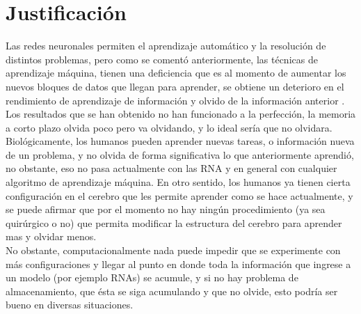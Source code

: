 \section{Justificación}
	
	
    Las redes neuronales permiten el aprendizaje automático y la resolución 
    de distintos problemas,  pero como se comentó anteriormente,  las técnicas 
    de aprendizaje máquina, tienen una deficiencia que es al momento de aumentar 
    los nuevos bloques de datos que llegan para aprender,  se obtiene un deterioro 
    en el rendimiento de aprendizaje de información y olvido de la información anterior \cite{bullinaria2009}.\\
    
    Los resultados que se han obtenido no han funcionado a la perfección, la 
    memoria a corto plazo olvida poco pero va olvidando, y lo ideal sería que no 
    olvidara. Biológicamente, los humanos pueden aprender nuevas tareas, o información 
    nueva de un problema, y no olvida de forma significativa lo que anteriormente 
    aprendió, no obstante, eso no pasa actualmente con las RNA y en general con 
    cualquier algoritmo de aprendizaje máquina. En otro sentido, los humanos 
    ya tienen cierta configuración en el cerebro que les permite aprender como 
    se hace actualmente,  y se puede afirmar que por el momento no hay ningún 
    procedimiento (ya sea quirúrgico o no) que permita modificar la estructura del cerebro 
    para aprender mas y olvidar menos.\\

    No obstante,  computacionalmente nada puede impedir que se experimente con más 
    configuraciones y llegar al punto en donde toda la información que ingrese a un 
    modelo (por ejemplo RNAs) se acumule, y si no hay problema de almacenamiento, que \'esta se siga 
    acumulando y que no olvide, esto podría ser bueno en diversas situaciones.\\

